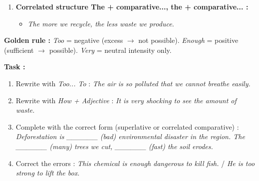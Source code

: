 \documentclass[11pt]{article}
\newcommand{\cle}[1]{{\popxbold\color{popdark}#1}}
\begin{document}
\begin{methode}
\begin{enumerate}
\begin{itemize}
    \end{itemize}
    \item \textbf{Correlated structure \cle{The + comparative..., the + comparative...} :}
    \begin{itemize}
        \item \textit{\cle{The more} we recycle, \cle{the less} waste we produce.}
    \end{itemize}
\end{enumerate}
\textbf{Golden rule :} \textit{Too} = negative (excess $\rightarrow$ not possible). \textit{Enough} = positive (sufficient $\rightarrow$ possible). \textit{Very} = neutral intensity only.
\end{methode}

\begin{exoresolu}
\textbf{Task :}
\begin{enumerate}
    \item Rewrite with \textit{Too... To} : \textit{The air is so polluted that we cannot breathe easily.}
    \item Rewrite with \textit{How + Adjective} : \textit{It is very shocking to see the amount of waste.}
    \item Complete with the correct form (superlative or correlated comparative) : \textit{Deforestation is \_\_\_\_\_\_ (bad) environmental disaster in the region. The \_\_\_\_\_\_ (many) trees we cut, \_\_\_\_\_\_ (fast) the soil erodes.}
    \item Correct the errors : \textit{This chemical is enough dangerous to kill fish.} / \textit{He is too strong to lift the box.}
\end{enumerate}


\end{exoresolu}
\end{document}
